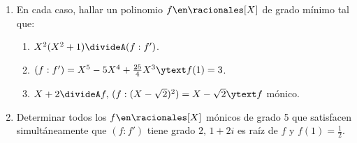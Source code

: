 \begin{enunciado}{\ejercicio}
  \begin{enumerate}[label=\roman*)]
    \item En cada caso, hallar un polinomio $f \en \racionales[X]$ de grado
          mínimo tal que:
          \begin{enumerate}[label=(\alph*)]
            \item $X^2(X^2 + 1) \divideA (f:f')$.
            \item $(f:f') = X^5 - 5X^4 + \frac{25}{4}X^3 \ytext f(1) = 3$.
            \item $X + 2 \divideA f,\, (f:(X - \sqrt{2})^2) = X - \sqrt{2}
                    \ytext f$ mónico.
          \end{enumerate}

    \item
          Determinar todos los $f \en \racionales[X]$ mónicos de grado 5 que satisfacen
          simultáneamente que $(f: f')$ tiene grado $2,\, 1+2i$ es raíz de $f$ y $f(1) = \frac{1}{2}$.
  \end{enumerate}
\end{enunciado}

\hacer
